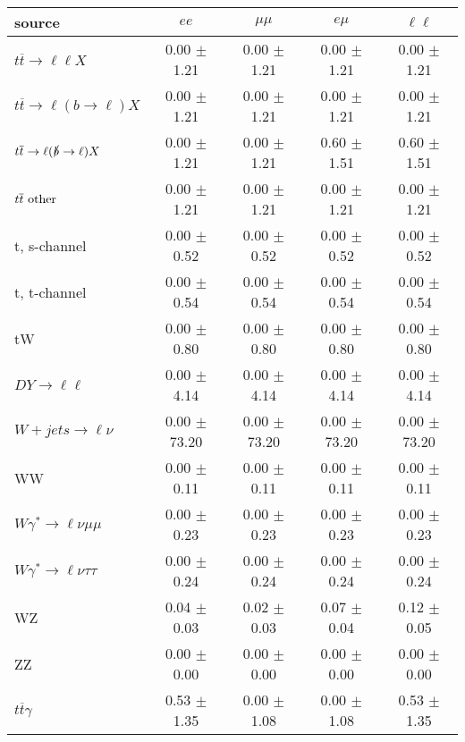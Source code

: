 \begin{tabular}{l|cccc} \hline\hline
source & $ee$ & $\mu\mu$ & $e\mu$ & $\ell\ell $ \\
\hline
$t\overline{t} \rightarrow \ell \ell X$ &  0.00 $\pm$  1.21 &  0.00 $\pm$  1.21 &  0.00 $\pm$  1.21 &  0.00 $\pm$  1.21 \\
$t\overline{t} \rightarrow \ell (b \rightarrow \ell) X$ &  0.00 $\pm$  1.21 &  0.00 $\pm$  1.21 &  0.00 $\pm$  1.21 &  0.00 $\pm$  1.21 \\
$t\overline{t} \rightarrow \ell (\slashed b \rightarrow \ell) X$ &  0.00 $\pm$  1.21 &  0.00 $\pm$  1.21 &  0.60 $\pm$  1.51 &  0.60 $\pm$  1.51 \\
        $t\overline{t}\ \rm{other}$ &  0.00 $\pm$  1.21 &  0.00 $\pm$  1.21 &  0.00 $\pm$  1.21 &  0.00 $\pm$  1.21 \\
\hline
                       t, s-channel &  0.00 $\pm$  0.52 &  0.00 $\pm$  0.52 &  0.00 $\pm$  0.52 &  0.00 $\pm$  0.52 \\
                       t, t-channel &  0.00 $\pm$  0.54 &  0.00 $\pm$  0.54 &  0.00 $\pm$  0.54 &  0.00 $\pm$  0.54 \\
                                 tW &  0.00 $\pm$  0.80 &  0.00 $\pm$  0.80 &  0.00 $\pm$  0.80 &  0.00 $\pm$  0.80 \\
\hline
         $DY \rightarrow \ell \ell$ &  0.00 $\pm$  4.14 &  0.00 $\pm$  4.14 &  0.00 $\pm$  4.14 &  0.00 $\pm$  4.14 \\
      $W+jets \rightarrow \ell \nu$ &  0.00 $\pm$ 73.20 &  0.00 $\pm$ 73.20 &  0.00 $\pm$ 73.20 &  0.00 $\pm$ 73.20 \\
                                 WW &  0.00 $\pm$  0.11 &  0.00 $\pm$  0.11 &  0.00 $\pm$  0.11 &  0.00 $\pm$  0.11 \\
\hline
$W\gamma^{*} \rightarrow \ell \nu \mu\mu$ &  0.00 $\pm$  0.23 &  0.00 $\pm$  0.23 &  0.00 $\pm$  0.23 &  0.00 $\pm$  0.23 \\
$W\gamma^{*} \rightarrow \ell \nu \tau\tau$ &  0.00 $\pm$  0.24 &  0.00 $\pm$  0.24 &  0.00 $\pm$  0.24 &  0.00 $\pm$  0.24 \\
                                 WZ &  0.04 $\pm$  0.03 &  0.02 $\pm$  0.03 &  0.07 $\pm$  0.04 &  0.12 $\pm$  0.05 \\
                                 ZZ &  0.00 $\pm$  0.00 &  0.00 $\pm$  0.00 &  0.00 $\pm$  0.00 &  0.00 $\pm$  0.00 \\
\hline
              $t\overline{t}\gamma$ &  0.53 $\pm$  1.35 &  0.00 $\pm$  1.08 &  0.00 $\pm$  1.08 &  0.53 $\pm$  1.35 \\

\end{tabular}
